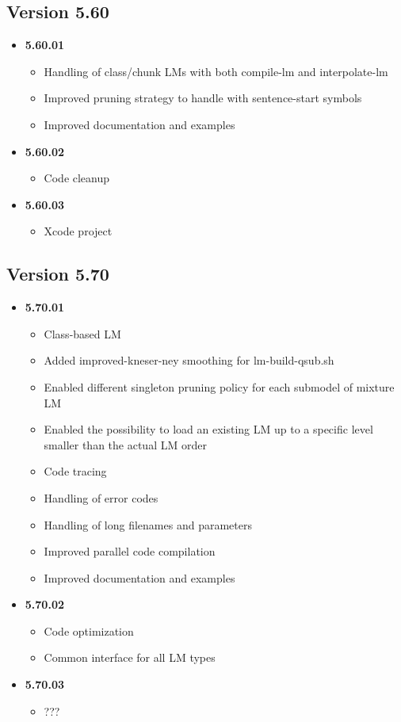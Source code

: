 \documentclass[11pt]{article}
\begin{document}
\subsection{Version 5.60}
\begin{itemize}
\item {\bf 5.60.01}
\begin{itemize}
\item Handling of class/chunk LMs with both compile-lm and interpolate-lm
\item Improved pruning strategy to handle with sentence-start symbols
\item Improved documentation and examples
\end{itemize}
\item {\bf 5.60.02}
\begin{itemize}
\item Code cleanup 
\end{itemize}
\item {\bf 5.60.03}
\begin{itemize}
\item Xcode project
\end{itemize}

\end{itemize}

\subsection{Version 5.70}
\begin{itemize}
\item {\bf 5.70.01}
\begin{itemize}
\item Class-based LM
\item Added improved-kneser-ney smoothing for lm-build-qsub.sh
\item Enabled different singleton pruning policy for each submodel of mixture LM
\item Enabled the possibility to load an existing LM up to a specific level smaller than the actual LM order
\item Code tracing
\item Handling of error codes
\item Handling of long filenames and parameters
\item Improved parallel code compilation
\item Improved documentation and examples
\end{itemize}
\item {\bf 5.70.02}
\begin{itemize}
\item Code optimization
\item Common interface for all LM types
\end{itemize}
\item {\bf 5.70.03}
\begin{itemize}
\item ???
\end{itemize}
\end{itemize}
\end{document}
